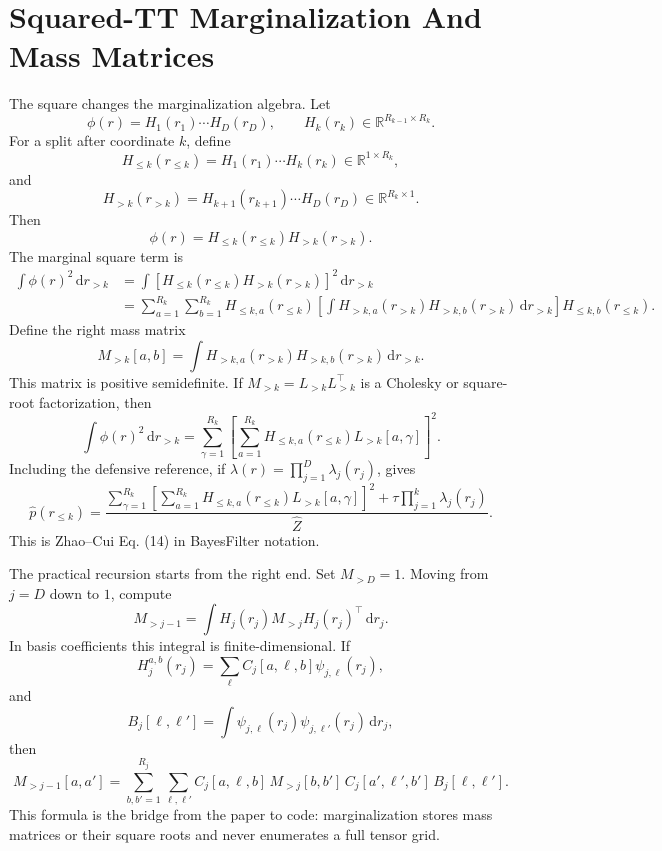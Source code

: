 \documentclass[11pt]{article}
\newcommand{\R}{\mathbb R}
\newcommand{\dd}{\,\mathrm d}
\begin{document}
\section{Squared-TT Marginalization And Mass Matrices}

The square changes the marginalization algebra.  Let
\[
    \phi(r)=H_1(r_1)\cdots H_D(r_D),
    \qquad H_k(r_k)\in\R^{R_{k-1}\times R_k}.
\]
For a split after coordinate \(k\), define
\[
    H_{\le k}(r_{\le k})=H_1(r_1)\cdots H_k(r_k)\in\R^{1\times R_k},
\]
and
\[
    H_{>k}(r_{>k})=H_{k+1}(r_{k+1})\cdots H_D(r_D)\in\R^{R_k\times 1}.
\]
Then
\[
    \phi(r)=H_{\le k}(r_{\le k})H_{>k}(r_{>k}).
\]
The marginal square term is
\[
\begin{aligned}
 \int \phi(r)^2\dd r_{>k}
 &=
 \int
 \left[
 H_{\le k}(r_{\le k})H_{>k}(r_{>k})
 \right]^2\dd r_{>k}\\
 &=
 \sum_{a=1}^{R_k}\sum_{b=1}^{R_k}
 H_{\le k,a}(r_{\le k})
 \left[
 \int H_{>k,a}(r_{>k})H_{>k,b}(r_{>k})\dd r_{>k}
 \right]
 H_{\le k,b}(r_{\le k}).
\end{aligned}
\tag{M1}
\]
Define the right mass matrix
\[
    M_{>k}[a,b]
    =
    \int H_{>k,a}(r_{>k})H_{>k,b}(r_{>k})\dd r_{>k}.
    \tag{M2}
\]
This matrix is positive semidefinite.  If \(M_{>k}=L_{>k}L_{>k}^\top\) is a
Cholesky or square-root factorization, then
\[
    \int \phi(r)^2\dd r_{>k}
    =
    \sum_{\gamma=1}^{R_k}
    \left[
    \sum_{a=1}^{R_k}H_{\le k,a}(r_{\le k})L_{>k}[a,\gamma]
    \right]^2.
    \tag{M3}
\]
Including the defensive reference, if
\(\lambda(r)=\prod_{j=1}^D\lambda_j(r_j)\), gives
\[
    \widehat p(r_{\le k})
    =
    \frac{
    \sum_{\gamma=1}^{R_k}
    \left[
    \sum_{a=1}^{R_k}H_{\le k,a}(r_{\le k})L_{>k}[a,\gamma]
    \right]^2
    +
    \tau\prod_{j=1}^k\lambda_j(r_j)}
    {\widehat Z}.
    \tag{M4}
\]
This is Zhao--Cui Eq. (14) in BayesFilter notation.

The practical recursion starts from the right end.  Set \(M_{>D}=1\).  Moving
from \(j=D\) down to \(1\), compute
\[
    M_{>j-1}
    =
    \int H_j(r_j)M_{>j}H_j(r_j)^\top\dd r_j.
    \tag{M5}
\]
In basis coefficients this integral is finite-dimensional.  If
\[
    H_j^{a,b}(r_j)=\sum_{\ell}C_j[a,\ell,b]\psi_{j,\ell}(r_j),
\]
and
\[
    B_j[\ell,\ell']
    =
    \int \psi_{j,\ell}(r_j)\psi_{j,\ell'}(r_j)\dd r_j,
\]
then
\[
    M_{>j-1}[a,a']
    =
    \sum_{b,b'=1}^{R_j}
    \sum_{\ell,\ell'}
    C_j[a,\ell,b]\,M_{>j}[b,b']\,C_j[a',\ell',b']\,B_j[\ell,\ell'].
    \tag{M6}
\]
This formula is the bridge from the paper to code: marginalization stores mass
matrices or their square roots and never enumerates a full tensor grid.
\end{document}
